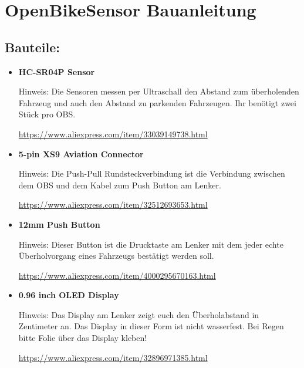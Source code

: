 \documentclass{scrartcl}
\author{}
\date{}
\begin{document}
\section*{OpenBikeSensor Bauanleitung}

\subsection*{Bauteile:}

\begin{itemize}
	\item \textbf{HC-SR04P Sensor}
	
	Hinweis: Die Sensoren messen per Ultraschall den Abstand zum
	überholenden Fahrzeug und auch den Abstand zu parkenden Fahrzeugen. Ihr
	benötigt zwei Stück pro OBS.
	
	\href{https://www.google.com/url?q=https://www.aliexpress.com/item/33039149738.html\&sa=D\&ust=1588976963766000}{https://www.aliexpress.com/item/33039149738.html}
	
	
	\item \textbf{5-pin XS9 Aviation Connector}
	
	Hinweis: Die Push-Pull Rundsteckverbindung ist die Verbindung zwischen
	dem OBS und dem Kabel zum Push Button am Lenker. 
	
	\href{https://www.google.com/url?q=https://www.aliexpress.com/item/32512693653.html\&sa=D\&ust=1588976963767000}{https://www.aliexpress.com/item/32512693653.html}
	
	
	
	\item \textbf{12mm Push Button}
	
	Hinweis: Dieser Button ist die Drucktaste am Lenker mit dem jeder echte
	Überholvorgang eines Fahrzeugs bestätigt werden soll.
	
	\href{https://www.google.com/url?q=https://www.aliexpress.com/item/4000295670163.html\&sa=D\&ust=1588976963768000}{https://www.aliexpress.com/item/4000295670163.html}
	
	
	
	\item \textbf{0.96 inch OLED Display}
	
	Hinweis: Das Display am Lenker zeigt euch den Überholabstand in
	Zentimeter an. Das Display in dieser Form ist nicht wasserfest. Bei
	Regen bitte Folie über das Display kleben!
	
	\href{https://www.google.com/url?q=https://www.aliexpress.com/item/32896971385.html\&sa=D\&ust=1588976963769000}{https://www.aliexpress.com/item/32896971385.html}
	

\end{itemize}
\end{document}
